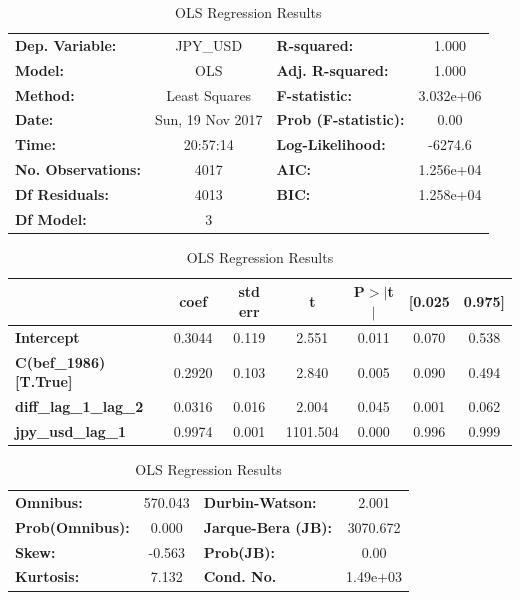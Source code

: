 \documentclass[]{article}
\begin{document}
\begin{table}
\begin{center}
	\begin{tabular}{lclc}
		\toprule
		\textbf{Dep. Variable:}       &     JPY\_USD      & \textbf{  R-squared:         } &     1.000   \\
		\textbf{Model:}               &       OLS        & \textbf{  Adj. R-squared:    } &     1.000   \\
		\textbf{Method:}              &  Least Squares   & \textbf{  F-statistic:       } & 3.032e+06   \\
		\textbf{Date:}                & Sun, 19 Nov 2017 & \textbf{  Prob (F-statistic):} &     0.00    \\
		\textbf{Time:}                &     20:57:14     & \textbf{  Log-Likelihood:    } &   -6274.6   \\
		\textbf{No. Observations:}    &        4017      & \textbf{  AIC:               } & 1.256e+04   \\
		\textbf{Df Residuals:}        &        4013      & \textbf{  BIC:               } & 1.258e+04   \\
		\textbf{Df Model:}            &           3      & \textbf{                     } &             \\
		\bottomrule
	\end{tabular}
	\begin{tabular}{lcccccc}
		& \textbf{coef} & \textbf{std err} & \textbf{t} & \textbf{P$>$$|$t$|$} & \textbf{[0.025} & \textbf{0.975]}  \\
		\midrule
		\textbf{Intercept}            &       0.3044  &        0.119     &     2.551  &         0.011        &        0.070    &        0.538     \\
		\textbf{C(bef\_1986)[T.True]} &       0.2920  &        0.103     &     2.840  &         0.005        &        0.090    &        0.494     \\
		\textbf{diff\_lag\_1\_lag\_2} &       0.0316  &        0.016     &     2.004  &         0.045        &        0.001    &        0.062     \\
		\textbf{jpy\_usd\_lag\_1}     &       0.9974  &        0.001     &  1101.504  &         0.000        &        0.996    &        0.999     \\
		\bottomrule
	\end{tabular}
	\begin{tabular}{lclc}
		\textbf{Omnibus:}       & 570.043 & \textbf{  Durbin-Watson:     } &    2.001  \\
		\textbf{Prob(Omnibus):} &   0.000 & \textbf{  Jarque-Bera (JB):  } & 3070.672  \\
		\textbf{Skew:}          &  -0.563 & \textbf{  Prob(JB):          } &     0.00  \\
		\textbf{Kurtosis:}      &   7.132 & \textbf{  Cond. No.          } & 1.49e+03  \\
		\bottomrule
	\end{tabular}

\end{center}
\caption{OLS Regression Results}
\label{tab:regression_results}
\end{table}
\end{document}
